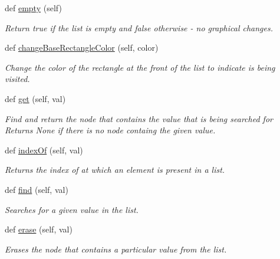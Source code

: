 \begin{DoxyCompactItemize}
\mbox{\label{class_doubly_linked_list_1_1_doubly_linked_list_a54d48f99282d4906f4e80f65de57e653}} 
def \hyperlink{class_doubly_linked_list_1_1_doubly_linked_list_a54d48f99282d4906f4e80f65de57e653}{empty} (self)
\begin{DoxyCompactList}\small\item\em Return true if the list is empty and false otherwise -\/ no graphical changes. \end{DoxyCompactList}\item 
def \hyperlink{class_doubly_linked_list_1_1_doubly_linked_list_a9ff8f3890900f8a626ba3eb7b3d34392}{change\+Base\+Rectangle\+Color} (self, color)
\begin{DoxyCompactList}\small\item\em Change the color of the rectangle at the front of the list to indicate is being visited. \end{DoxyCompactList}\item 
def \hyperlink{class_doubly_linked_list_1_1_doubly_linked_list_ae379d989c37b1e2fbed7b6bf6d14b780}{get} (self, val)
\begin{DoxyCompactList}\small\item\em Find and return the node that contains the value that is being searched for Returns None if there is no node containg the given value. \end{DoxyCompactList}\item 
def \hyperlink{class_doubly_linked_list_1_1_doubly_linked_list_aea5b7935cef243763de6c35417234ef2}{index\+Of} (self, val)
\begin{DoxyCompactList}\small\item\em Returns the index of at which an element is present in a list. \end{DoxyCompactList}\item 
def \hyperlink{class_doubly_linked_list_1_1_doubly_linked_list_ade9f220296c0811e8fd642c2cdfad0d8}{find} (self, val)
\begin{DoxyCompactList}\small\item\em Searches for a given value in the list. \end{DoxyCompactList}\item 
def \hyperlink{class_doubly_linked_list_1_1_doubly_linked_list_ad8cbc7268bda83aca4799dcaea3ab33e}{erase} (self, val)
\begin{DoxyCompactList}\small\item\em Erases the node that contains a particular value from the list. \end{DoxyCompactList}\item 

\end{DoxyCompactItemize}
